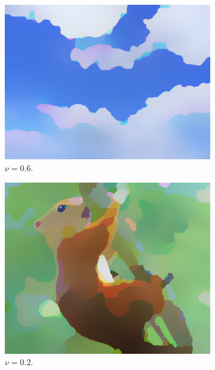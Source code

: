 \documentclass[abstracton]{scrreprt}
\begin{document}
\begin{figure}[!ht]
\begin{subfigure}[b]{0.16\textwidth}
                    \includegraphics[width=\textwidth]{img/segmentation/rt/06blue.png}
                    \caption{$\nu = 0.6$.}
                \end{subfigure}
                \begin{subfigure}[b]{0.16\textwidth}
                    \includegraphics[width=\textwidth]{img/segmentation/rt/02squirrel.png}
                    \caption{$\nu = 0.2$.}
                \end{subfigure}
                \begin{subfigure}[b]{0.16\textwidth}

\end{subfigure}
\end{figure}
\end{document}
